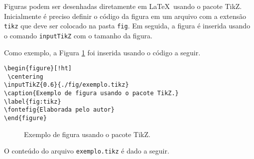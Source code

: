Figuras podem ser desenhadas diretamente em \LaTeX\ usando o pacote TikZ. Inicialmente é preciso definir o código da figura em um arquivo com a extensão \verb|tikz| que deve ser colocado na pasta \verb|fig|. Em seguida, a figura é inserida usando o comando \verb|inputTikZ| com o tamanho da figura.

Como exemplo, a Figura \ref{fig:tikz} foi inserida usando o código a seguir.

\begin{verbatim}
\begin{figure}[!ht]
 \centering
\inputTikZ{0.6}{./fig/exemplo.tikz}
\caption{Exemplo de figura usando o pacote TikZ.}
\label{fig:tikz}
\fontefig{Elaborada pelo autor}
\end{figure}
\end{verbatim}

\begin{figure}[!ht]
 \centering
{}
\caption{Exemplo de figura usando o pacote TikZ.}
\label{fig:tikz}
\end{figure}

O conteúdo do arquivo \verb|exemplo.tikz| é dado a seguir.

